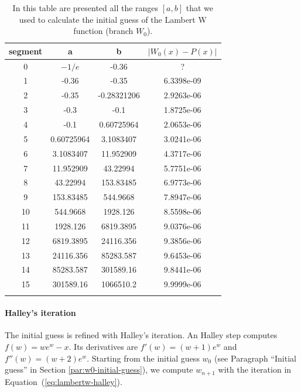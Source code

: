 \documentclass[12pt]{amsart}
\begin{document}
\begin{table}[htp]
\begin{tabular}{cccc}
segment & a           & b            & $|W_0(x)-P(x)|$ \\[0.05cm]
\hline
0       & $-1/e$      & -0.36        & ?               \\[0.05cm]
1       & -0.36       & -0.35        & 6.3398e-09      \\[0.05cm]
2       & -0.35       & -0.28321206  & 2.9263e-06      \\[0.05cm]
3       & -0.3        & -0.1         & 1.8725e-06      \\[0.05cm]
4       & -0.1        & 0.60725964   & 2.0653e-06      \\[0.05cm]
5       & 0.60725964  & 3.1083407    & 3.0241e-06      \\[0.05cm]
6       & 3.1083407   & 11.952909    & 4.3717e-06      \\[0.05cm]
7       & 11.952909   & 43.22994     & 5.7751e-06      \\[0.05cm]
8       & 43.22994    & 153.83485    & 6.9773e-06      \\[0.05cm]
9       & 153.83485   & 544.9668     & 7.8947e-06      \\[0.05cm]
10      & 544.9668    & 1928.126     & 8.5598e-06      \\[0.05cm]
11      & 1928.126    & 6819.3895    & 9.0376e-06      \\[0.05cm]
12      & 6819.3895   & 24116.356    & 9.3856e-06      \\[0.05cm]
13      & 24116.356   & 85283.587    & 9.6453e-06      \\[0.05cm]
14      & 85283.587   & 301589.16    & 9.8441e-06      \\[0.05cm]
15      & 301589.16   & 1066510.2    & 9.9999e-06      \\[0.05cm]
\hline                                                 \\
\end{tabular}
\caption{In this table are presented all the ranges $[a,b]$ that we
  used to calculate the initial guess of the Lambert W function
(branch $W_0$).}
\label{tab:w0-poly-initial-guess}
\end{table}

\paragraph{\textbf{Halley's iteration}}
The initial guess is refined with Halley's iteration. An Halley step computes
$f(w) = we^w - x$. Its derivatives are $f'(w) = (w+1)e^w$ and $f''(w) =
(w+2)e^w$. Starting from the initial guess $w_0$ (see Paragraph ``Initial
guess'' in Section \ref{par:w0-initial-guess}), we compute $w_{n+1}$ with the
iteration in Equation~(\ref{eq:lambertw-halley}).
\end{document}
